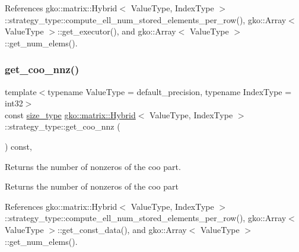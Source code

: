 References gko\+::matrix\+::\+Hybrid$<$ Value\+Type, Index\+Type $>$\+::strategy\+\_\+type\+::compute\+\_\+ell\+\_\+num\+\_\+stored\+\_\+elements\+\_\+per\+\_\+row(), gko\+::\+Array$<$ Value\+Type $>$\+::get\+\_\+executor(), and gko\+::\+Array$<$ Value\+Type $>$\+::get\+\_\+num\+\_\+elems().

\mbox{\label{classgko_1_1matrix_1_1Hybrid_1_1strategy__type_a4eab8283af5bbec83dab7c7f24df32ab}} 
\subsubsection{\texorpdfstring{get\+\_\+coo\+\_\+nnz()}{get\_coo\_nnz()}}
{\footnotesize\ttfamily template$<$typename Value\+Type = default\+\_\+precision, typename Index\+Type = int32$>$ \\
const \hyperlink{namespacegko_a6e5c95df0ae4e47aab2f604a22d98ee7}{size\+\_\+type} \hyperlink{classgko_1_1matrix_1_1Hybrid}{gko\+::matrix\+::\+Hybrid}$<$ Value\+Type, Index\+Type $>$\+::strategy\+\_\+type\+::get\+\_\+coo\+\_\+nnz (\begin{DoxyParamCaption}{ }\end{DoxyParamCaption}) const\hspace{0.3cm}{\ttfamily [inline]}, {\ttfamily [noexcept]}}



Returns the number of nonzeros of the coo part. 

\begin{DoxyReturn}{Returns}
the number of nonzeros of the coo part 
\end{DoxyReturn}


References gko\+::matrix\+::\+Hybrid$<$ Value\+Type, Index\+Type $>$\+::strategy\+\_\+type\+::compute\+\_\+ell\+\_\+num\+\_\+stored\+\_\+elements\+\_\+per\+\_\+row(), gko\+::\+Array$<$ Value\+Type $>$\+::get\+\_\+const\+\_\+data(), and gko\+::\+Array$<$ Value\+Type $>$\+::get\+\_\+num\+\_\+elems().

\mbox{\label{classgko_1_1matrix_1_1Hybrid_1_1strategy__type_a3a1bc0e4837a3fde7650455088c3da8a}} 
